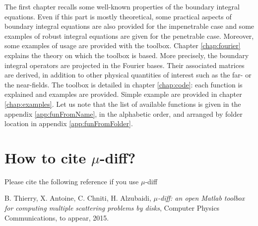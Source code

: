 The first chapter recalls some well-known properties of the boundary integral equations. Even if this part is mostly theoretical, some practical
aspects of boundary integral equations are also provided for the impenetrable case and some examples of robust integral equations are given for the
 penetrable case. Moreover, some examples of usage are provided with the \mudiff toolbox. Chapter \ref{chap:fourier} explains the theory on which the \mudiff toolbox is based. More precisely, the boundary integral operators are projected in the Fourier bases. Their associated matrices are derived, in addition to other physical
  quantities of interest such as the far- or the near-fields. The \mudiff toolbox is detailed in chapter  \ref{chap:code}: each function is explained and
   examples are provided. Simple example are provided in chapter \ref{chap:examples}.
   Let us note that the list of available functions is given in the appendix  \ref{app:funFromName}, in the alphabetic order, and arranged by folder location in appendix \ref{app:funFromFolder}.



\section*{How to cite $\mu$-diff?}



Please cite the following reference if you use $\mu$-diff

\medskip

B. Thierry, X. Antoine, C. Chniti, H. Alzubaidi, \textit{$\mu$-diff: an open Matlab toolbox for computing multiple scattering problems by disks},
Computer Physics Communications, to appear, 2015.



